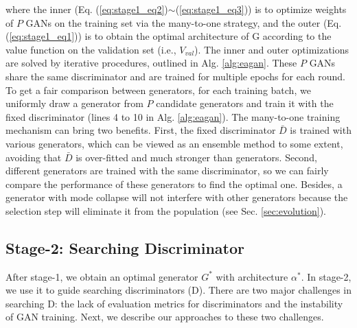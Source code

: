\documentclass[runningheads]{llncs}
\begin{document}
\noindent where the inner (Eq. (\ref{eq:stage1_eq2})$\sim$(\ref{eq:stage1_eq3})) is to optimize weights of $P$ GANs on the training set via the many-to-one strategy, and the outer (Eq. (\ref{eq:stage1_eq1})) is to obtain the optimal architecture of G according to the value function on the validation set (i.e., $V_{val}$). The inner and outer optimizations are solved by iterative procedures, outlined in Alg. \ref{alg:eagan}. These $P$ GANs share the same discriminator and are trained for multiple epochs for each round. To get a fair comparison between generators, for each training batch, we uniformly draw a generator from $P$ candidate generators and train it with the fixed discriminator (lines 4 to 10 in Alg. \ref{alg:eagan}). The many-to-one training mechanism can bring two benefits. First, the fixed discriminator $\bar{D}$ is trained with various generators, which can be viewed as an ensemble method to some extent, avoiding that $\bar{D}$ is over-fitted and much stronger than generators. Second, different generators are trained with the same discriminator, so we can fairly compare the performance of these generators to find the optimal one. Besides, a generator with mode collapse will not interfere with other generators because the selection step will eliminate it from the population (see Sec. \ref{sec:evolution}).
















\subsection{Stage-2: Searching Discriminator}\label{sec:stage2}




After stage-1, we obtain an optimal generator $ G^* $ with architecture $ \alpha^* $. In stage-2, we use it to guide searching discriminators (D). There are two major challenges in searching D: the lack of evaluation metrics for discriminators and the instability of GAN training. Next, we describe our approaches to these two challenges.
\end{document}
